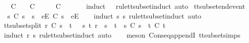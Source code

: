 \begin{isabellebody}
\ \ {\isachardoublequoteopen}{\isasymrho}{\isacharprime}\ {\isasymsubseteq}\isactrlsub C\ {\isasymrho}\ {\isasymLongrightarrow}\ {\isasymsigma}{\isacharprime}\ {\isasymsubseteq}\isactrlsub C\ {\isasymsigma}\ {\isasymLongrightarrow}\ {\isasymrho}{\isacharprime}\ {\isacharat}\ {\isasymsigma}{\isacharprime}\ {\isasymsubseteq}\isactrlsub C\ {\isasymrho}\ {\isacharat}\ {\isasymsigma}{\isachardoublequoteclose}\isanewline
%
\isadelimproof
\ \ %
\endisadelimproof
%
\isatagproof
{}\isamarkupfalse%
\ {\isacharparenleft}induct\ {\isasymrho}{\isacharprime}\ {\isasymrho}\ rule{\isacharcolon}tt{\isacharunderscore}subset{\isachardot}induct{\isacharcomma}\ auto{\isacharparenright}%
\endisatagproof
{\isafoldproof}%
%
\isadelimproof
\isanewline
%
\endisadelimproof
\isanewline
{}\isamarkupfalse%
\ tt{\isacharunderscore}subset{\isacharunderscore}end{\isacharunderscore}event{\isacharcolon}\isanewline
\ \ {\isachardoublequoteopen}s{\isacharprime}\ {\isasymsubseteq}\isactrlsub C\ s\ {\isasymLongrightarrow}\ s{\isacharprime}\ {\isacharat}\ {\isacharbrackleft}{\isacharbrackleft}e{\isacharbrackright}\isactrlsub E{\isacharbrackright}\ {\isasymsubseteq}\isactrlsub C\ s\ {\isacharat}\ {\isacharbrackleft}{\isacharbrackleft}e{\isacharbrackright}\isactrlsub E{\isacharbrackright}{\isachardoublequoteclose}\isanewline
%
\isadelimproof
\ \ %
\endisadelimproof
%
\isatagproof
{}\isamarkupfalse%
\ {\isacharparenleft}induct\ s{\isacharprime}\ s\ rule{\isacharcolon}tt{\isacharunderscore}subset{\isachardot}induct{\isacharcomma}\ auto{\isacharparenright}%
\endisatagproof
{\isafoldproof}%
%
\isadelimproof
\ \ \ \isanewline
%
\endisadelimproof
\isanewline
{}\isamarkupfalse%
\ tt{\isacharunderscore}subset{\isacharunderscore}split{\isacharcolon}\ {\isachardoublequoteopen}r\ {\isasymsubseteq}\isactrlsub C\ s\ {\isacharat}\ t\ {\isasymLongrightarrow}\ {\isasymexists}\ s{\isacharprime}\ t{\isacharprime}{\isachardot}\ r\ {\isacharequal}\ s{\isacharprime}\ {\isacharat}\ t{\isacharprime}\ {\isasymand}\ s{\isacharprime}\ {\isasymsubseteq}\isactrlsub C\ s\ {\isasymand}\ t{\isacharprime}\ {\isasymsubseteq}\isactrlsub C\ t{\isachardoublequoteclose}\isanewline
%
\isadelimproof
\ \ %
\endisadelimproof
%
\isatagproof
{}\isamarkupfalse%
\ {\isacharparenleft}induct\ r\ s\ rule{\isacharcolon}tt{\isacharunderscore}subset{\isachardot}induct{\isacharcomma}\ auto{\isacharparenright}\isanewline
\ \ \isamarkupfalse%
\ {\isacharparenleft}meson\ Cons{\isacharunderscore}eq{\isacharunderscore}appendI\ tt{\isacharunderscore}subset{\isachardot}simps{\isacharparenleft}{}{\isacharparenright}{\isacharparenright}\isanewline

\end{isabellebody}
